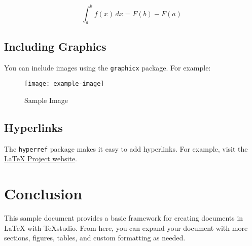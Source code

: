 \documentclass[12pt]{article}
\begin{document}
	\[
	\int_{a}^{b} f(x) \, dx = F(b) - F(a)
	\]
	
	\subsection{Including Graphics}
	You can include images using the \texttt{graphicx} package. For example:
	
	\begin{figure}[h!]
		\centering
		\texttt{[image: example-image]} %
		\caption{Sample Image}
		\label{fig:sample}
	\end{figure}
	
	\subsection{Hyperlinks}
	The \texttt{hyperref} package makes it easy to add hyperlinks. For example, visit the \href{https://www.latex-project.org/}{LaTeX Project website}.
	
	\section{Conclusion}
	This sample document provides a basic framework for creating documents in LaTeX with TeXstudio. From here, you can expand your document with more sections, figures, tables, and custom formatting as needed.
	
\end{document}
